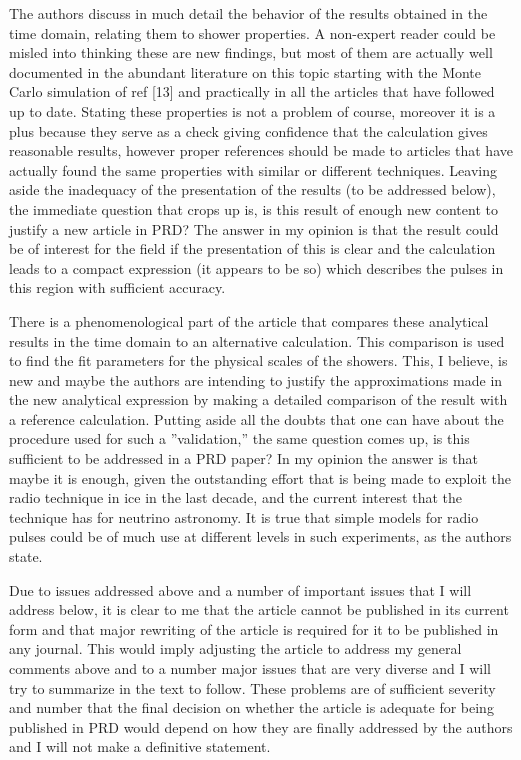 \documentclass[12pt]{article}
\begin{document}
The authors discuss in much detail the behavior of the results obtained in the time domain, relating them to shower properties. A non-expert reader could be misled into thinking these are new findings, but most of them are actually well documented in the abundant literature on this topic starting with the Monte Carlo simulation of ref [13] and practically in all the articles that have followed up to date. Stating these properties is not a problem of course, moreover it is a plus because they serve as a check giving confidence that the calculation gives reasonable results, however proper references should be made to articles that have actually found the same properties with similar or different techniques. Leaving aside the inadequacy of the presentation of the results (to be addressed below), the immediate question that crops up is, is this result of enough new content to justify a new article in PRD? The
answer in my opinion is that the result could be of interest for the field if the presentation of this is clear and the calculation leads to a compact expression (it appears to be so) which describes the pulses in this region with sufficient accuracy.

There is a phenomenological part of the article that compares these analytical results in the time domain to an alternative calculation. This comparison is used to find the fit parameters for the physical
scales of the showers. This, I believe, is new and maybe the authors are intending to justify the approximations made in the new analytical expression by making a detailed comparison of the result with a
reference calculation. Putting aside all the doubts that one can have about the procedure used for such a ''validation,'' the same question comes up, is this sufficient to be addressed in a PRD paper? In my
opinion the answer is that maybe it is enough, given the outstanding effort that is being made to exploit the radio technique in ice in the last decade, and the current interest that the technique has for
neutrino astronomy. It is true that simple models for radio pulses could be of much use at different levels in such experiments, as the authors state.  

Due to issues addressed above and a number of important issues that I will address below, it is clear to me that the article cannot be published in its current form and that major rewriting of the article is required for it to be published in any journal. This would imply adjusting the article to address my general comments above and to a number major issues that are very diverse and I will try to summarize
in the text to follow. These problems are of sufficient severity and number that the final decision on whether the article is adequate for being published in PRD would depend on how they are finally addressed
by the authors and I will not make a definitive statement.  \\
\end{document}
